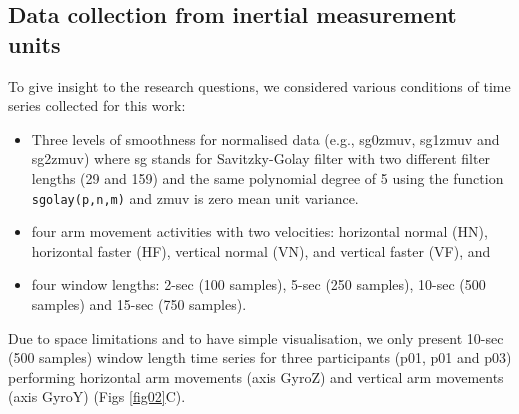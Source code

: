 \documentclass[fleqn,10pt]{wlscirep}
\begin{document}
\subsection*{Data collection from inertial measurement units} 
\label{sec:experiment:subsec:imu}
To give insight to the research questions, we considered various conditions of time series collected for this work:
\begin{itemize}
\item Three levels of smoothness for normalised data (e.g., sg0zmuv, sg1zmuv and sg2zmuv) where sg stands for Savitzky-Golay filter with two different filter lengths (29 and 159) and the same polynomial degree of 5 using the function \texttt{sgolay(p,n,m)} \cite{Rsignal} and zmuv is zero mean unit variance.
\item four arm movement activities with two velocities: horizontal normal (HN), horizontal faster (HF), vertical normal (VN), and vertical faster (VF), and
\item four window lengths: 2-sec (100 samples), 5-sec (250 samples), 10-sec (500 samples) and 15-sec (750 samples).
\end{itemize}
Due to space limitations and to have simple visualisation, we only present 10-sec (500 samples) window length time series for three participants (p01, p01 and p03) performing horizontal arm movements (axis GyroZ) and vertical arm movements (axis GyroY) (Figs \ref{fig02}C).
\end{document}
